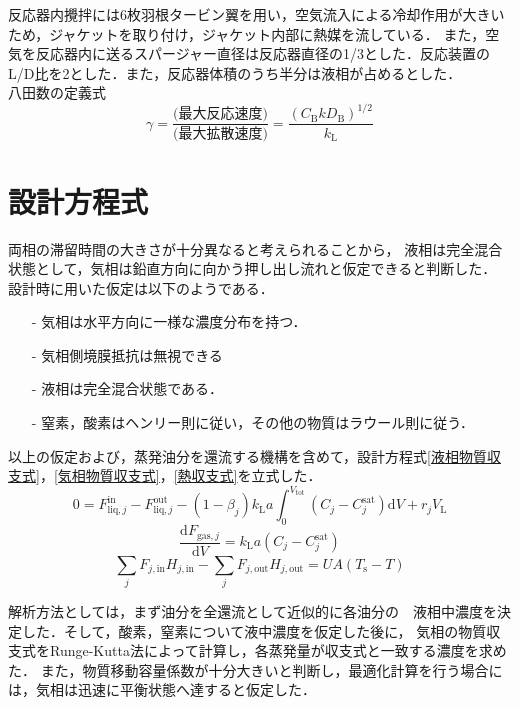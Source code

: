 \documentclass[a4j]{jsreport}
\newcommand{\diff}{\mathrm{d}}
\begin{document}
反応器内攪拌には6枚羽根タービン翼を用い，空気流入による冷却作用が大きいため，ジャケットを取り付け，ジャケット内部に熱媒を流している．
また，空気を反応器内に送るスパージャー直径は反応器直径の1/3とした．反応装置のL/D比を2とした．また，反応器体積のうち半分は液相が占めるとした．\\

八田数の定義式
\begin{equation}
    \gamma = \frac{\text{(最大反応速度)}}{\text{(最大拡散速度)}} = \frac{(C_\mathrm{B} k D_\mathrm{B})^{1/2}}{k_\mathrm{L}}
\end{equation}

\section{設計方程式}
両相の滞留時間の大きさが十分異なると考えられることから，
液相は完全混合状態として，気相は鉛直方向に向かう押し出し流れと仮定できると判断した．
設計時に用いた仮定は以下のようである．
\begin{itemize}
    \item[-] 気相は水平方向に一様な濃度分布を持つ．
    \item[-] 気相側境膜抵抗は無視できる
    \item[-] 液相は完全混合状態である．
    \item[-] 窒素，酸素はヘンリー則に従い，その他の物質はラウール則に従う．
\end{itemize}
以上の仮定および，蒸発油分を還流する機構を含めて，設計方程式\eqref{液相物質収支式}，\eqref{気相物質収支式}，\eqref{熱収支式}を立式した．
\begin{equation}
    \label{液相物質収支式}
    0 = F^\text{in}_{\text{liq},j} - F^\text{out}_{\text{liq},j} - (1 - \beta_j) k_\mathrm{L} a \int^{V_\text{tot}}_0(C_j - C^\text{sat}_j) \diff V + r_j V_\mathrm{L}
\end{equation}
\begin{equation}
    \label{気相物質収支式}
    \frac{\diff F_{\text{gas},j}}{\diff V} = k_\mathrm{L} a (C_j - C^\text{sat}_j)
\end{equation}
\begin{equation}
    \label{熱収支式}
    \sum_jF_{j,\mathrm{in}}H_{j,\mathrm{in}}-\sum_jF_{j,\text{out}}H_{j,\text{out}} = UA(T_\mathrm{s}-T)
\end{equation}

解析方法としては，まず油分を全還流として近似的に各油分の　液相中濃度を決定した．そして，酸素，窒素について液中濃度を仮定した後に，
気相の物質収支式をRunge-Kutta法によって計算し，各蒸発量が収支式と一致する濃度を求めた．
また，物質移動容量係数が十分大きいと判断し，最適化計算を行う場合には，気相は迅速に平衡状態へ達すると仮定した．
\end{document}
